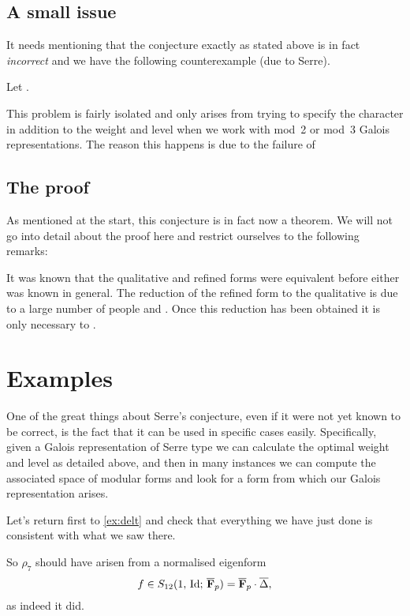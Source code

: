 \documentclass[a4paper,12pt]{article}
\begin{document}
\subsection{A small issue}
It needs mentioning that the conjecture exactly as stated above is in fact \emph{incorrect} and we have the following counterexample (due to Serre).

\begin{ex}
Let . %
\end{ex}

This problem is fairly isolated and only arises from trying to specify the character in addition to the weight and level when we work with mod~2 or mod~3 Galois representations.
The reason this happens is due to the failure of


\subsection{The proof}
As mentioned at the start, this conjecture is in fact now a theorem.
We will not go into detail about the proof here and restrict ourselves to the following remarks:

It was known that the qualitative and refined forms were equivalent before either was known in general.
The reduction of the refined form to the qualitative is due to a large number of people and .
Once this reduction has been obtained it is only necessary to .


\section{Examples}
One of the great things about Serre's conjecture, even if it were not yet known to be correct, is the fact that it can be used in specific cases easily.
Specifically, given a Galois representation of Serre type we can calculate the optimal weight and level as detailed above, and then in many instances we can compute the associated space of modular forms and look for a form from which our Galois representation arises.

\begin{ex}
Let's return first to \cref{ex:delt} and check that everything we have just done is consistent with what we saw there.

So $\rho_{7}$ should have arisen from a normalised eigenform
\[
f\in S_{12}(1,\,\mathrm{Id};\,\overline{\mathbf{F}}_p) = \overline{\mathbf{F}}_p\cdot \overline{\Delta},
\]
as indeed it did.
\end{ex}
\end{document}
